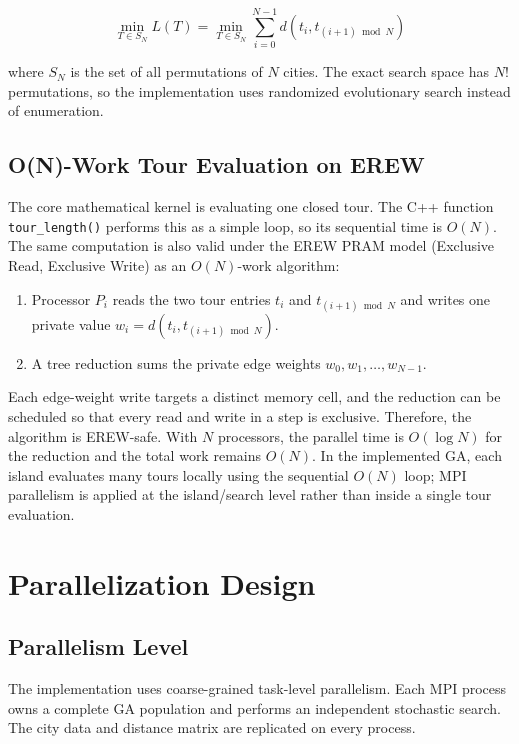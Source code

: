 \documentclass[11pt,a4paper]{article}
\begin{document}
\[
  \min_{T \in S_N} L(T)
  =
  \min_{T \in S_N}
  \sum_{i=0}^{N-1} d(t_i,t_{(i+1)\bmod N})
\]

where $S_N$ is the set of all permutations of $N$ cities. The exact search
space has $N!$ permutations, so the implementation uses randomized evolutionary
search instead of enumeration.

\subsection{O(N)-Work Tour Evaluation on EREW}
The core mathematical kernel is evaluating one closed tour. The C++ function
\texttt{tour\_length()} performs this as a simple loop, so its sequential time
is $O(N)$. The same computation is also valid under the EREW PRAM model
(Exclusive Read, Exclusive Write) as an $O(N)$-work algorithm:

\begin{enumerate}[leftmargin=*]
  \item Processor $P_i$ reads the two tour entries $t_i$ and
  $t_{(i+1)\bmod N}$ and writes one private value
  $w_i=d(t_i,t_{(i+1)\bmod N})$.
  \item A tree reduction sums the private edge weights
  $w_0,w_1,\ldots,w_{N-1}$.
\end{enumerate}

Each edge-weight write targets a distinct memory cell, and the reduction can be
scheduled so that every read and write in a step is exclusive. Therefore, the
algorithm is EREW-safe. With $N$ processors, the parallel time is $O(\log N)$
for the reduction and the total work remains $O(N)$. In the implemented GA,
each island evaluates many tours locally using the sequential $O(N)$ loop; MPI
parallelism is applied at the island/search level rather than inside a single
tour evaluation.
\newpage

\section{Parallelization Design}

\subsection{Parallelism Level}
The implementation uses coarse-grained task-level parallelism. Each MPI process
owns a complete GA population and performs an independent stochastic search.
The city data and distance matrix are replicated on every process.
\end{document}
